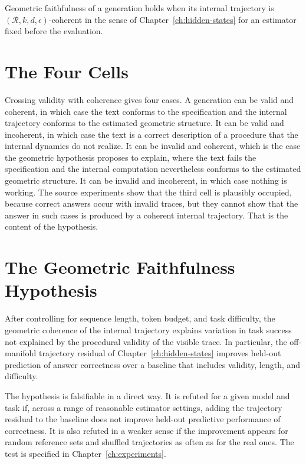 \begin{definition}\label{def:coherent-ref}
Geometric faithfulness of a generation holds when its internal trajectory is $(\mathcal R,k,d,\epsilon)$-coherent in the sense of Chapter~\ref{ch:hidden-states} for an estimator fixed before the evaluation.
\end{definition}

\section{The Four Cells}

Crossing validity with coherence gives four cases. A generation can be valid and coherent, in which case the text conforms to the specification and the internal trajectory conforms to the estimated geometric structure. It can be valid and incoherent, in which case the text is a correct description of a procedure that the internal dynamics do not realize. It can be invalid and coherent, which is the case the geometric hypothesis proposes to explain, where the text fails the specification and the internal computation nevertheless conforms to the estimated geometric structure. It can be invalid and incoherent, in which case nothing is working. The source experiments show that the third cell is plausibly occupied, because correct answers occur with invalid traces, but they cannot show that the answer in such cases is produced by a coherent internal trajectory. That is the content of the hypothesis.

\section{The Geometric Faithfulness Hypothesis}

\begin{hypothesis}\label{hyp:geom}
After controlling for sequence length, token budget, and task difficulty, the geometric coherence of the internal trajectory explains variation in task success not explained by the procedural validity of the visible trace. In particular, the off-manifold trajectory residual of Chapter~\ref{ch:hidden-states} improves held-out prediction of answer correctness over a baseline that includes validity, length, and difficulty.
\end{hypothesis}

The hypothesis is falsifiable in a direct way. It is refuted for a given model and task if, across a range of reasonable estimator settings, adding the trajectory residual to the baseline does not improve held-out predictive performance of correctness. It is also refuted in a weaker sense if the improvement appears for random reference sets and shuffled trajectories as often as for the real ones. The test is specified in Chapter~\ref{ch:experiments}.

